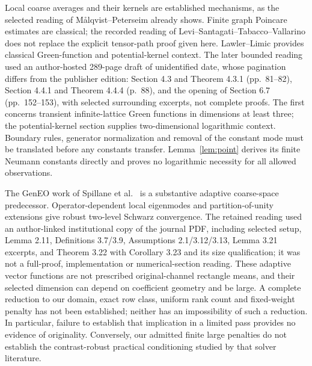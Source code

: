 Local coarse averages and their kernels are established mechanisms, as the
selected reading of M\aa lqvist--Peterseim \cite[Sections 2.2--2.3]{MP}
already shows. Finite graph Poincare estimates are classical; the recorded
reading of Levi--Santagati--Tabacco--Vallarino \cite[Section 2, Theorem 2.1]{LSTV}
does not replace the explicit tensor-path proof given here.
Lawler--Limic \cite{LL} provides classical Green-function and potential-kernel
context. The later bounded reading used an author-hosted 289-page draft of
unidentified date, whose pagination differs from the publisher edition:
Section 4.3 and Theorem 4.3.1 (pp.~81--82), Section 4.4.1 and Theorem 4.4.4
(p.~88), and the opening of Section 6.7 (pp.~152--153), with selected
surrounding excerpts, not complete proofs. The first concerns transient
infinite-lattice Green functions in dimensions at least three; the
potential-kernel section supplies two-dimensional logarithmic context.
Boundary rules, generator normalization and removal of the constant mode
must be translated before any constants transfer. Lemma~\ref{lem:point}
derives its finite Neumann constants directly and proves no logarithmic
necessity for all allowed observations.

The GenEO work of Spillane et al.\ \cite{GenEO} is a substantive adaptive
coarse-space predecessor. Operator-dependent local eigenmodes and
partition-of-unity extensions give robust two-level Schwarz convergence.
The retained reading used an author-linked institutional copy of the journal
PDF, including selected setup, Lemma 2.11, Definitions 3.7/3.9,
Assumptions 2.1/3.12/3.13, Lemma 3.21 excerpts, and Theorem 3.22 with
Corollary 3.23 and its size qualification; it was not a full-proof,
implementation or numerical-section reading. These adaptive vector functions
are not prescribed original-channel rectangle means, and their selected
dimension can depend on coefficient geometry and be large. A complete
reduction to our domain, exact row class, uniform rank count and fixed-weight
penalty has not been established; neither has an impossibility of such a
reduction. In particular, failure to establish that implication in a limited
pass provides no evidence of originality. Conversely, our admitted finite
large penalties do not establish the contrast-robust practical conditioning
studied by that solver literature.

